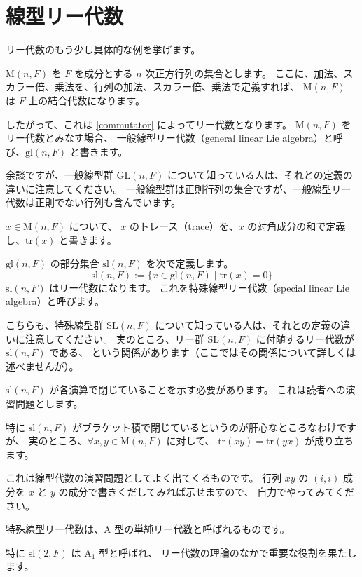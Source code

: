 \documentclass{ltjsarticle}
\renewenvironment{proof}{\begin{usmproof}}{\end{usmproof}}
\begin{document}
\section{線型リー代数}

リー代数のもう少し具体的な例を挙げます。

\begin{example}[一般線型リー代数]
    \(\mathrm{M}(n,F)\) を \(F\) を成分とする \(n\) 次正方行列の集合とします。
    ここに、加法、スカラー倍、乗法を、行列の加法、スカラー倍、乗法で定義すれば、
    \(\mathrm{M}(n,F)\) は \(F\) 上の結合代数になります。

    したがって、これは \cref{commutator} によってリー代数となります。
    \(\mathrm{M}(n,F)\) をリー代数とみなす場合、
    一般線型リー代数（general linear Lie algebra）と呼び、\(\mathrm{gl}(n,F)\) と書きます。
\end{example}

余談ですが、一般線型群 \(\mathrm{GL}(n,F)\) について知っている人は、それとの定義の違いに注意してください。
一般線型群は正則行列の集合ですが、一般線型リー代数は正則でない行列も含んでいます。

\begin{definition}[行列のトレース]
    \(x \in \mathrm{M}(n,F)\) について、
    \(x\) のトレース（trace）を、\(x\) の対角成分の和で定義し、\(\mathrm{tr}(x)\) と書きます。
\end{definition}

\begin{example}[特殊線型リー代数]
    \(\mathrm{gl}(n,F)\) の部分集合 \(\mathrm{sl}(n,F)\) を次で定義します。
    \[
        \mathrm{sl}(n,F) := \{x \in \mathrm{gl}(n,F) \mid \mathrm{tr}(x) = 0\}
    \]
    \(\mathrm{sl}(n,F)\) はリー代数になります。
    これを特殊線型リー代数（special linear Lie algebra）と呼びます。
\end{example}

こちらも、特殊線型群 \(\mathrm{SL}(n,F)\) について知っている人は、それとの定義の違いに注意してください。
実のところ、リー群 \(\mathrm{SL}(n,F)\) に付随するリー代数が \(\mathrm{sl}(n,F)\) である、
という関係があります（ここではその関係について詳しくは述べませんが）。

\begin{proof}
    \(\mathrm{sl}(n,F)\) が各演算で閉じていることを示す必要があります。
    これは読者への演習問題とします。
\end{proof}

特に \(\mathrm{sl}(n,F)\) がブラケット積で閉じているというのが肝心なところなわけですが、
実のところ、\(\forall x,y \in \mathrm{M}(n,F)\) に対して、
\(\mathrm{tr}(xy) = \mathrm{tr}(yx)\) が成り立ちます。

これは線型代数の演習問題としてよく出てくるものです。
行列 \(xy\) の \((i,i)\) 成分を \(x\) と \(y\) の成分で書きくだしてみれば示せますので、
自力でやってみてください。

特殊線型リー代数は、\(\mathrm{A}\) 型の単純リー代数と呼ばれるものです。

特に \(\mathrm{sl}(2,F)\) は \(\mathrm{A}_1\) 型と呼ばれ、
リー代数の理論のなかで重要な役割を果たします。
\end{document}
